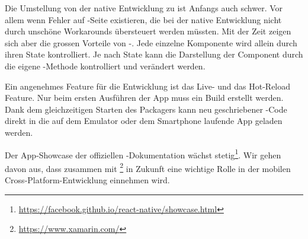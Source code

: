Die Umstellung von der native Entwicklung zu  ist Anfangs auch schwer. 
Vor allem wenn Fehler auf -Seite existieren, die bei der native Entwicklung nicht durch unschöne Workarounds übersteuert werden müssten. 
Mit der Zeit zeigen sich aber die grossen Vorteile von -. 
Jede einzelne Komponente wird allein durch ihren State kontrolliert. 
Je nach State kann die Darstellung der Component durch die eigene -Methode kontrolliert und verändert werden. 

Ein angenehmes Feature für die Entwicklung ist das Live- und das Hot-Reload Feature. 
Nur beim ersten Ausführen der App muss ein Build erstellt werden.
Dank dem gleichzeitigen Starten des \gls{Packager}s kann neu geschriebener -Code direkt in  die auf dem Emulator oder dem Smartphone laufende App geladen werden.

Der App-Showcase der offiziellen -Dokumentation wächst stetig\footnote{\url{https://facebook.github.io/react-native/showcase.html}}.
Wir gehen davon aus, dass  zusammen mit \footnote{\url{https://www.xamarin.com/}} in Zukunft eine wichtige Rolle in der mobilen Cross-Platform-Entwicklung einnehmen wird.